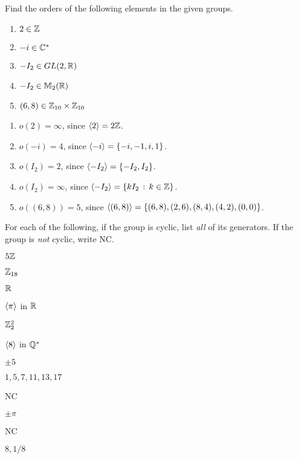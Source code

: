 \begin{exercise}
Find the orders of the following elements in the given groups.

\begin{enumerate}
\item $2\in \mathbb{Z}$
\item $-i\in \mathbb{C}^*$
\item $-I_2\in GL(2,\mathbb{R})$
\item $-I_2\in \mathbb{M}_2(\mathbb{R})$
\item $(6,8)\in \mathbb{Z}_{10}\times \mathbb{Z}_{10}$
\end{enumerate}
\end{exercise}

\begin{solution}[print=true]
\begin{enumerate}
\item $o(2)=\infty$, since $\langle2\rangle=2\mathbb{Z}$.
\item $o(-i)=4$, since $\langle-i\rangle=\{-i,-1,i,1\}$.
\item $o(I_2)=2$, since $\langle-I_2\rangle=\{-I_2,I_2\}$.
\item $o(I_2)=\infty$, since $\langle-I_2\rangle=\{kI_2\,:\,k\in \mathbb{Z}\}$.
\item $o((6,8))=5$, since $\langle(6,8)\rangle=\{(6,8),(2,6),(8,4),(4,2),(0,0)\}$.
\end{enumerate}
\end{solution}

\begin{exercise}
For each of the following, if the group is cyclic, list \textit{all} of its generators. If the group is \textit{not} cyclic, write NC.

\medskip

\noindent
\begin{inparaenum}[(a)]
\item $5\mathbb{Z}$ \hfill
\item $\mathbb{Z}_{18}$ \hfill
\item $\mathbb{R}$ \hfill
\item $\langle\pi\rangle$ in $\mathbb{R}$ \hfill
\item $\mathbb{Z}_2^2$ \hfill
\item $\langle8\rangle$ in $\mathbb{Q}^*$
\end{inparaenum}

\end{exercise}

\begin{solution}[print=true]

\begin{inparaenum}[(a)]
\item $\pm 5$ \hfill
\item $1,5,7,11,13,17$ \hfill
\item NC \hfill
\item $\pm \pi$ \hfill
\item NC \hfill
\item $8,1/8$
\end{inparaenum}

\end{solution}


